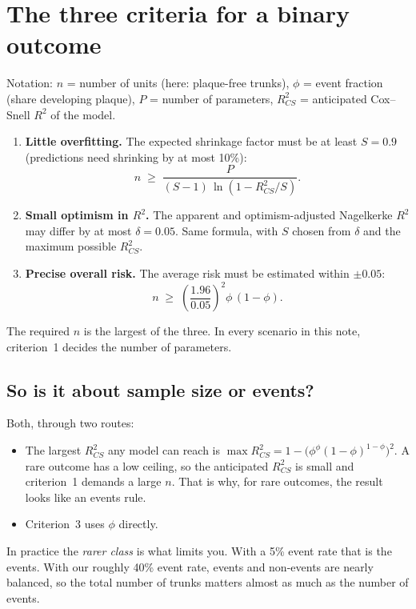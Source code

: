 \documentclass[11pt,a4paper]{article}
\begin{document}
\section{The three criteria for a binary outcome}

Notation: $n$ = number of units (here: plaque-free trunks), $\phi$ = event fraction (share
developing plaque), $P$ = number of parameters, $R^2_{CS}$ = anticipated Cox--Snell $R^2$ of the
model.

\begin{enumerate}
  \item \textbf{Little overfitting.} The expected shrinkage factor must be at least $S = 0.9$
        (predictions need shrinking by at most 10\%):
        \[
          n \;\geq\; \frac{P}{(S-1)\,\ln\!\left(1 - R^2_{CS}/S\right)} .
        \]
  \item \textbf{Small optimism in $R^2$.} The apparent and optimism-adjusted Nagelkerke $R^2$
        may differ by at most $\delta = 0.05$. Same formula, with $S$ chosen from
        $\delta$ and the maximum possible $R^2_{CS}$.
  \item \textbf{Precise overall risk.} The average risk must be estimated within $\pm 0.05$:
        \[
          n \;\geq\; \left(\frac{1.96}{0.05}\right)^{2} \phi\,(1-\phi) .
        \]
\end{enumerate}
The required $n$ is the largest of the three. In every scenario in this note, criterion~1 decides
the number of parameters.

\subsection*{So is it about sample size or events?}

Both, through two routes:
\begin{itemize}
  \item The largest $R^2_{CS}$ any model can reach is
        $\max R^2_{CS} = 1 - \bigl(\phi^{\phi}(1-\phi)^{1-\phi}\bigr)^2$. A rare outcome has a low
        ceiling, so the anticipated $R^2_{CS}$ is small and criterion~1 demands a large $n$. That is
        why, for rare outcomes, the result looks like an events rule.
  \item Criterion~3 uses $\phi$ directly.
\end{itemize}
In practice the \emph{rarer class} is what limits you. With a 5\% event rate that is the events.
With our roughly 40\% event rate, events and non-events are nearly balanced, so the total number of
trunks matters almost as much as the number of events.
\end{document}
